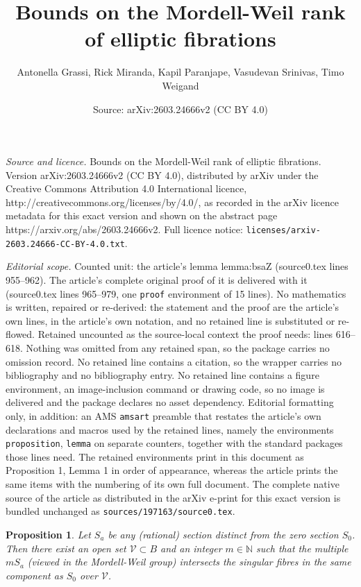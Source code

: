 \documentclass[10pt,a4paper]{amsart}
\title{Bounds on the Mordell-Weil rank of elliptic fibrations}
\author{Antonella Grassi, Rick Miranda, Kapil Paranjape, Vasudevan Srinivas, Timo Weigand}
\date{Source: arXiv:2603.24666v2 (CC BY 4.0)}
\newtheorem{proposition}{Proposition}
\begin{document}
\maketitle

\noindent\emph{Source and licence.} Bounds on the Mordell-Weil rank of elliptic fibrations. Version arXiv:2603.24666v2 (CC BY 4.0), distributed by arXiv under the Creative Commons Attribution 4.0 International licence, http://creativecommons.org/licenses/by/4.0/, as recorded in the arXiv licence metadata for this exact version and shown on the abstract page https://arxiv.org/abs/2603.24666v2. Full licence notice: \texttt{licenses/arxiv-2603.24666-CC-BY-4.0.txt}.\par\smallskip

\noindent\textit{Editorial scope.} Counted unit: the article's lemma lemma:bsaZ (source0.tex lines 955--962). The article's complete original proof of it is delivered with it (source0.tex lines 965--979, one \texttt{proof} environment of 15 lines). No mathematics is written, repaired or re-derived: the statement and the proof are the article's own lines, in the article's own notation, and no retained line is substituted or re-flowed.  Retained uncounted as the source-local context the proof needs: lines 616--618.  Nothing was omitted from any retained span, so the package carries no omission record.  No retained line contains a citation, so the wrapper carries no bibliography and no bibliography entry.  No retained line contains a figure environment, an image-inclusion command or drawing code, so no image is delivered and the package declares no asset dependency.  Editorial formatting only, in addition: an AMS \texttt{amsart} preamble that restates the article's own declarations and macros used by the retained lines, namely the environments \texttt{proposition}, \texttt{lemma} on separate counters, together with the standard packages those lines need.  The retained environments print in this document as Proposition 1, Lemma 1 in order of appearance, whereas the article prints the same items with the numbering of its own full document.  The complete native source of the article as distributed in the arXiv e-print for this exact version is bundled unchanged as \texttt{sources/197163/source0.tex}.
\begin{proposition}\label{prop:CoxZucker}
  Let $S_a$ be any (rational) section distinct from the zero section $S_0$.  Then there  exist an open set $\mathcal{V} \subset B$  and  an integer $m\in\mathbb{N}$ such that the multiple $m S_a$ (viewed in the Mordell-Weil group) intersects  the singular fibres in the same component as $S_0$ over $\mathcal{V}$.
\end{proposition}
\end{document}
